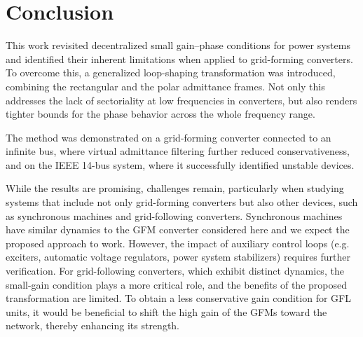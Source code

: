 \section{Conclusion}
\label{sec:conc}

This work revisited decentralized small gain–phase conditions for power systems and identified their inherent limitations when applied to grid-forming converters. To overcome this, a generalized loop-shaping transformation was introduced, combining the rectangular and the polar admittance frames. Not only this addresses the lack of sectoriality at low frequencies in converters, but also renders tighter bounds for the phase behavior across the whole frequency range.

The method was demonstrated on a grid-forming converter connected to an infinite bus, where virtual admittance filtering further reduced conservativeness, and on the IEEE 14-bus system, where it successfully identified unstable devices. 

While the results are promising, challenges remain, particularly when studying systems that include not only grid-forming converters but also other devices, such as synchronous machines and grid-following converters. Synchronous machines have similar dynamics to the GFM converter considered here and we expect the proposed approach to work. However, the impact of auxiliary control loops (e.g. exciters, automatic voltage regulators, power system stabilizers) requires further verification. 
For grid-following converters, which exhibit distinct dynamics, the small-gain condition plays a more critical role, and the benefits of the proposed transformation are limited. 
To obtain a less conservative gain condition for GFL units, it would be beneficial to shift the high gain of the GFMs toward the network, thereby enhancing its strength.




